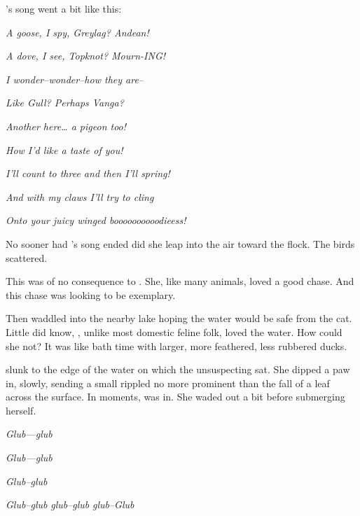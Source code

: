 \doublenewpage
\noindent
\pixel's song went a bit like this:
\VV


\textit{A goose, I spy, Greylag? Andean!}


\textit{A dove, I see, Topknot? Mourn-ING!}
\VV


\textit{I wonder--wonder--how they are--}


\textit{Like Gull? Perhaps Vanga?}
\VV

\textit{Another here\ldots{} a pigeon too!}


\textit{How I'd like a taste of you!}
\VV


\textit{I'll count to three and then I'll spring!}


\textit{And with my claws I'll try to cling}


\textit{Onto your juicy winged boooooooooodieess!}
\VV


\noindent
No sooner had \pixel's song ended did she leap into the air toward the flock.
The birds scattered.
\VV


\noindent
This was of no consequence to \pixel.  She, like many animals, loved a good chase.
And this chase was looking to be exemplary.
\VV


\noindent
Then \gooseF{} waddled into the nearby lake hoping the water would be safe
from the cat.  Little did \goose{} know, \pixel{}, unlike most domestic feline folk,
loved the water.  How could she not?  It was like bath time with larger,
more feathered, less rubbered ducks.
\VV


\noindent
\pixel{} slunk to the edge of the water on which the unsuspecting \goose{} sat.
She dipped a paw in, slowly, sending a small rippled no more prominent than
the fall of a leaf across the surface.  In moments, \pixel{} was in.
She waded out a bit before submerging herself.
\VV


\textit{\Large{}Glub\normalsize---\Large{}glub\normalsize}


\hspace*{14ex}\textit{\large{}Glub\normalsize---glub}


\hspace*{25.5ex}\textit{\large{}Glub\normalsize--glub}


\hspace*{36ex}\textit{Glub--glub}
\hspace{1ex}\textit{glub--glub}
\hspace{1ex}\textit{\large{}glub\normalsize--\LARGE{}Glub\normalsize}
\VV


